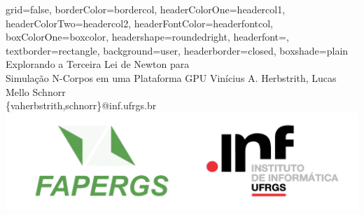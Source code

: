\documentclass[a0paper,portrait]{baposter}
\begin{document}
\begin{poster}{
grid=false,
borderColor=bordercol, %
headerColorOne=headercol1, %
headerColorTwo=headercol2, %
headerFontColor=headerfontcol, %
boxColorOne=boxcolor, %
headershape=roundedright, %
headerfont=\Large\sf, %
textborder=rectangle,
background=user,
headerborder=closed, %
boxshade=plain
}
{}
%
%
{\sf Explorando a Terceira Lei de Newton para \\ Simulação N-Corpos em
  uma Plataforma GPU} %
{\vspace{1em} Vinícius A. Herbstrith, Lucas Mello Schnorr\\ %
{\smaller \{vaherbstrith,schnorr\}@inf.ufrgs.br}} %
{\includegraphics[scale=0.10]{logo_fapergs_inf.pdf}} %




\end{poster}
\end{document}
